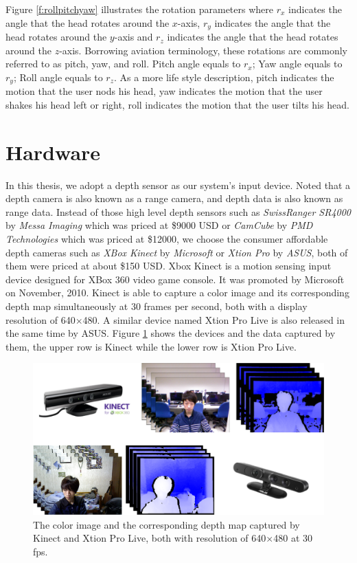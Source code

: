 Figure \ref{f:rollpitchyaw} illustrates the rotation parameters where $r_{x}$ indicates the angle that the head rotates around the $x$-axis, $r_{y}$ indicates the angle that the head rotates around the $y$-axis and $r_{z}$ indicates the angle that the head rotates around the $z$-axis. Borrowing aviation terminology, these rotations are commonly referred to as pitch, yaw, and roll. Pitch angle equals to $r_{x}$; Yaw angle equals to $r_{y}$; Roll angle equals to $r_{z}$. As a more life style description, pitch indicates the motion that the user nods his head, yaw indicates the motion that the user shakes his head left or right, roll indicates the motion that the user tilts his head.

 
\section{Hardware}
\label{s:hardware}
In this thesis, we adopt a depth sensor as our system's input device. Noted that a depth camera is also known as a range camera, and depth data is also known as range data. Instead of those high level depth sensors such as \emph{SwissRanger SR4000}  by \emph{Messa Imaging} which was priced at \$9000 USD or \emph{CamCube} by \emph{PMD Technologies} which was priced at \$12000, we choose the consumer affordable depth cameras such as \emph{XBox Kinect} by \emph{Microsoft} or \emph{Xtion Pro} by \emph{ASUS}, both of them were priced at about \$150 USD.
Xbox Kinect is a motion sensing input device designed for XBox 360 video game console. It was promoted by Microsoft on November, 2010. Kinect is able to capture a color image and its corresponding depth map simultaneously at 30 frames per second, both with a display resolution of 640$\times$480. A similar device named Xtion Pro Live is also released in the same time by ASUS. Figure \ref{f:kinect} shows the devices and the data captured by them, the upper row is Kinect while the lower row is Xtion Pro Live.
\begin{figure}
\centering
\includegraphics[width=1.0\linewidth]{./figure/kinect.png}
\caption{The color image and the corresponding depth map captured by Kinect and Xtion Pro Live, both with resolution of 640$\times$480 at 30 fps.}
\label{f:kinect}
\end{figure}

